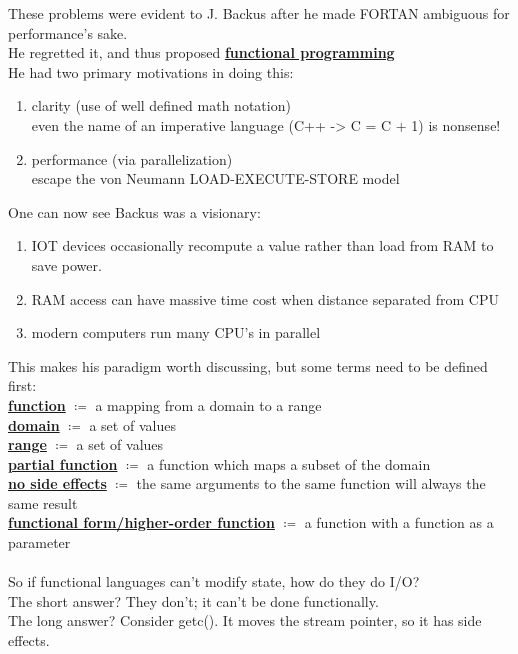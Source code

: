 \documentclass[../../lecture_notes.tex]{subfiles}
\begin{document}
These problems were evident to J. Backus after he made FORTAN ambiguous for performance's sake.\\
He regretted it, and thus proposed \textbf{\underline{functional programming}}\\
He had two primary motivations in doing this: \begin{enumerate}[itemsep=0mm]
	\item clarity (use of well defined math notation)\\
		even the name of an imperative language (C++ -> C = C + 1) is nonsense!
	\item performance (via parallelization)\\
		escape the von Neumann LOAD-EXECUTE-STORE model
	\end{enumerate}

\noindent One can now see Backus was a visionary: \begin{enumerate}[itemsep=0mm]
	\item IOT devices occasionally recompute a value rather than load from RAM to save power.
	\item RAM access can have massive time cost when distance separated from CPU
	\item modern computers run many CPU's in parallel
	\end{enumerate}
This makes his paradigm worth discussing, but some terms need to be defined first:\\
	\indent \textbf{\underline{function}} $\coloneqq$ a mapping from a domain to a range\\
	\indent \textbf{\underline{domain}} $\coloneqq$ a set of values\\
	\indent \textbf{\underline{range}} $\coloneqq$ a set of values\\
	\indent \textbf{\underline{partial function}} $\coloneqq$ a function which maps a subset of the domain\\
	\indent \textbf{\underline{no side effects}} $\coloneqq$ 
		the same arguments to the same function will always the same result\\
	\indent \textbf{\underline{functional form/higher-order function}} $\coloneqq$
		a function with a function as a parameter\\
\\
So if functional languages can't modify state, how do they do I/O?\\
	\indent The short answer? They don't; it can't be done functionally. \\
	\indent The long answer? Consider getc().  It moves the stream pointer, so it has side effects.\\
\end{document}
